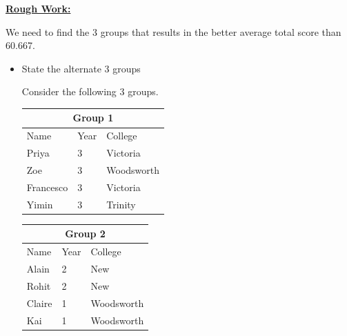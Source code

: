 \documentclass[12pt]{article}
\begin{document}
\begin{mdframed}
    \underline{\textbf{Rough Work:}}

    \bigskip

    We need to find the 3 groups that results in the better average total score
    than 60.667.

    \bigskip

    \begin{itemize}
        \item State the alternate 3 groups

        \begin{mdframed}
        Consider the following 3 groups.

        \bigskip

        \begin{center}
            \centering
            \begin{tabular}{|p{2.5cm}|p{2.5cm}|p{2.5cm}|}
                \hline
                \multicolumn{3}{|c|}{\textbf{Group 1}}\\
                \hline
                Name & Year & College\\
                \hline
                Priya & 3 & Victoria\\
                \hline
                Zoe & 3 & Woodsworth\\
                \hline
                Francesco & 3 & Victoria\\
                \hline
                Yimin & 3 & Trinity\\
                \hline
            \end{tabular}

            \bigskip

            \begin{tabular}{|p{2.5cm}|p{2.5cm}|p{2.5cm}|}
                \hline
                \multicolumn{3}{|c|}{\textbf{Group 2}}\\
                \hline
                Name & Year & College\\
                \hline
                Alain & 2 & New\\
                \hline
                Rohit & 2 & New\\
                \hline
                Claire & 1 & Woodsworth\\
                \hline
                Kai & 1 & Woodsworth\\
                \hline
            \end{tabular}


\end{center}
\end{mdframed}
\end{itemize}
\end{mdframed}
\end{document}

